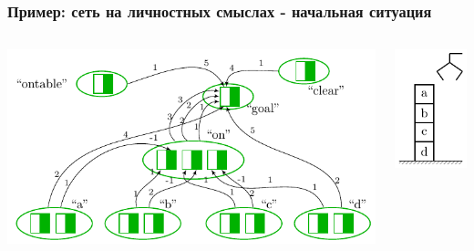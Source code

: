 \documentclass[default]{beamer}
\begin{document}
	\begin{frame}
		\frametitle{Пример: сеть на личностных смыслах - начальная ситуация}
		\begin{columns}
			\begin{column}{0.7\textwidth}
				\centering
				\includegraphics[page=3,width=\textwidth]{plan/plan_nets}
			\end{column}
			\begin{column}{0.3\textwidth}
				\centering
				\includegraphics[page=1,width=\textwidth]{plan/block_world}
			\end{column}
		\end{columns}
	\end{frame}	
\end{document}
